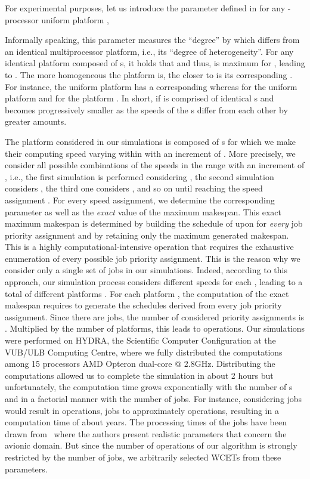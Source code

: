 \documentclass{article}
\newtheorem{validity test}{Validity Test}
\begin{document}
For experimental purposes, let us introduce the parameter  defined in \cite{FunkGoossensBaruah:01} for any -processor uniform platform , 
 
Informally speaking, this parameter  measures the ``degree'' by which  differs from an identical multiprocessor platform, i.e., its ``degree of heterogeneity''. For any identical platform composed of  s, it holds that  and thus,  is maximum for , leading to . The more homogeneous the platform  is, the closer to  is its corresponding . For instance, the uniform platform  has a corresponding  whereas  for the uniform platform  and  for the platform . In short,  if  is comprised of  identical s and becomes progressively smaller as the speeds of the s differ from each other by greater amounts. 

The platform  considered in our simulations is composed of  s for which we make their computing speed varying within  with an increment of . More precisely, we consider all possible combinations of the  speeds in the range  with an increment of , i.e., the first simulation is performed considering , the second simulation considers , the third one considers , and so on until reaching the speed assignment . For every speed assignment, we determine the corresponding parameter  as well as the \emph{exact} value  of the maximum makespan. This exact maximum makespan  is determined by building the schedule of  upon  for \emph{every} job priority assignment and by retaining only the maximum generated makespan. This is a highly computational-intensive operation that requires the exhaustive enumeration of every possible job priority assignment. This is the reason why we consider only a single set  of jobs in our simulations. Indeed, according to this approach, our simulation process considers  different speeds for each , leading to a total of  different platforms . For each platform , the computation of the exact makespan requires to generate the schedules derived from every job priority assignment. Since there are  jobs, the number of considered priority assignments is . Multiplied by the number of platforms, this leads to  operations. Our simulations were performed on HYDRA, the Scientific Computer Configuration at the VUB/ULB Computing Centre, where we fully distributed the computations among 15 processors AMD Opteron dual-core @ 2.8GHz. Distributing the computations allowed us to complete the simulation in about 2 hours but unfortunately, the computation time grows exponentially with the number of s and in a factorial manner with the number of jobs. For instance, considering  jobs would result in  operations,  jobs to approximately  operations, resulting in a computation time of about  years. The processing times of the jobs have been drawn from~\cite{IainBate:98} where the authors present realistic parameters that concern the avionic domain. But since the number of operations of our algorithm is strongly restricted by the number of jobs, we arbitrarily selected  WCETs from these parameters. 
\end{document}
